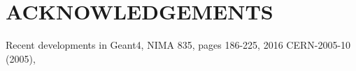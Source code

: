 \documentclass[a4paper,
               keeplastbox,   %
               ]{jacow}
\begin{document}
\section{ACKNOWLEDGEMENTS}

%
%

%
	{\printbibliography}%
	{%
	
	\begin{thebibliography}{9} %
	
	 Recent developments in Geant4, NIMA 835, pages 186-225, 2016 
	 CERN-2005-10 (2005), 
	

	\end{thebibliography}
} %


% 
\end{document}
